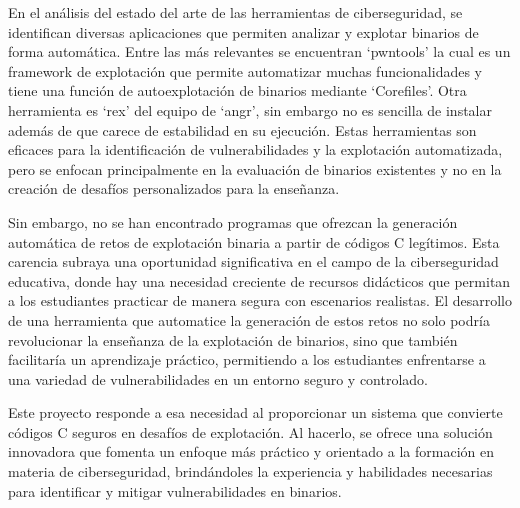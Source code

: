 En el análisis del estado del arte de las herramientas de ciberseguridad, se identifican diversas aplicaciones que permiten analizar y explotar binarios de forma automática.
Entre las más relevantes se encuentran `pwntools' la cual es un framework de explotación que permite automatizar muchas funcionalidades y tiene una función de autoexplotación de binarios mediante `Corefiles'.
Otra herramienta es `rex' del equipo de `angr', sin embargo no es sencilla de instalar además de que carece de estabilidad en su ejecución.
Estas herramientas son eficaces para la identificación de vulnerabilidades y la explotación automatizada, pero se enfocan principalmente en la evaluación de binarios existentes y no en la creación de desafíos personalizados para la enseñanza.

Sin embargo, no se han encontrado programas que ofrezcan la generación automática de retos de explotación binaria a partir de códigos C legítimos.
Esta carencia subraya una oportunidad significativa en el campo de la ciberseguridad educativa, donde hay una necesidad creciente de recursos didácticos que permitan a los estudiantes practicar de manera segura con escenarios realistas.
El desarrollo de una herramienta que automatice la generación de estos retos no solo podría revolucionar la enseñanza de la explotación de binarios, sino que también facilitaría un aprendizaje práctico, permitiendo a los estudiantes enfrentarse a una variedad de vulnerabilidades en un entorno seguro y controlado.

Este proyecto responde a esa necesidad al proporcionar un sistema que convierte códigos C seguros en desafíos de explotación.
Al hacerlo, se ofrece una solución innovadora que fomenta un enfoque más práctico y orientado a la formación en materia de ciberseguridad, brindándoles la experiencia y habilidades necesarias para identificar y mitigar vulnerabilidades en binarios.